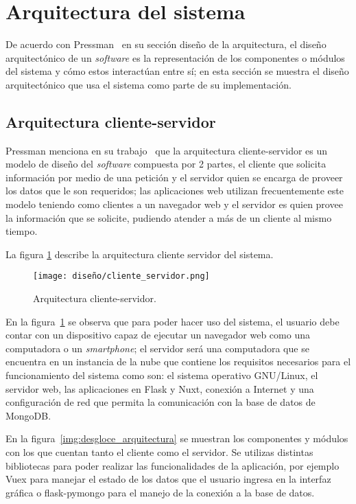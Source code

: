 \section{Arquitectura del sistema}

De acuerdo con Pressman~\cite{pressman_software_2005} en su sección diseño de la arquitectura, el diseño arquitectónico de un \textit{software} es la representación de los componentes o módulos del sistema y cómo estos interactúan entre sí; en esta sección se muestra el diseño arquitectónico que usa el sistema como parte de su implementación.

\subsection{Arquitectura cliente-servidor}

Pressman menciona en su trabajo~\cite{pressman_software_2005} que la arquitectura cliente-servidor es un modelo de diseño del \textit{software} compuesta por 2 partes, el cliente que solicita información por medio de una petición y el servidor quien se encarga de proveer los datos que le son requeridos; las aplicaciones web utilizan frecuentemente este modelo teniendo como clientes a un navegador web y el servidor es quien provee la información que se solicite, pudiendo atender a más de un cliente al mismo tiempo.

La figura \ref{img:arq_client_server} describe la arquitectura cliente servidor del sistema.

\begin{figure}[H]
    \centering
    \texttt{[image: diseño/cliente\_servidor.png]}
    \caption{Arquitectura cliente-servidor.}
    \label{img:arq_client_server}
\end{figure}


En la figura~\ref{img:arq_client_server} se observa que para poder hacer uso del sistema, el usuario debe contar con un dispositivo capaz de ejecutar un navegador web como una computadora o un \textit{smartphone}; el servidor será una computadora que se encuentra en un instancia de la nube que contiene los requisitos necesarios para el funcionamiento del sistema como son: el sistema operativo GNU/Linux, el servidor web, las aplicaciones en Flask y Nuxt, conexión a Internet y una configuración de red que permita la comunicación con la base de datos de MongoDB.

En la figura~\ref{img:desgloce_arquitectura} se muestran los componentes y módulos con los que cuentan tanto el cliente como el servidor. Se utilizas distintas bibliotecas para poder realizar las funcionalidades de la aplicación, por ejemplo Vuex para manejar el estado de los datos que el usuario ingresa en la interfaz gráfica o flask-pymongo para el manejo de la conexión a la base de datos.

